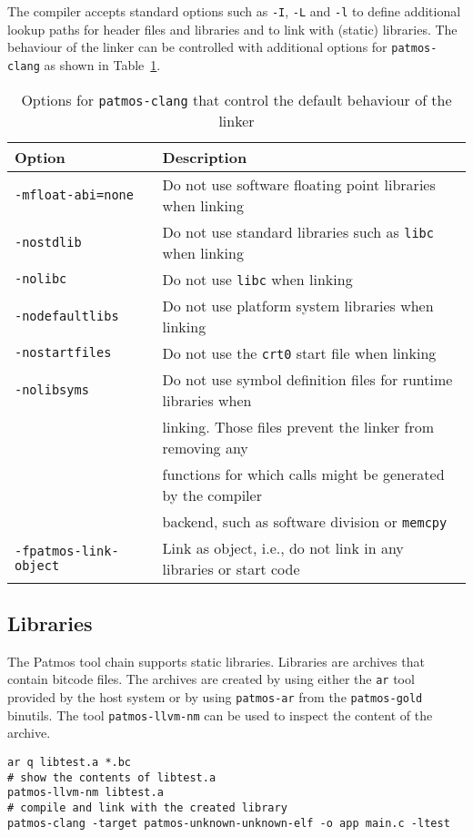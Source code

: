 The compiler accepts standard options such as \texttt{-I}, \texttt{-L} and \texttt{-l} to define additional
lookup paths for header files and libraries and to link with (static) libraries.
The behaviour of the linker can be controlled with additional options for \texttt{patmos-clang} 
as shown in Table~\ref{tab:linker_options}.

\begin{table}
\centering
\begin{tabular}{ll}
Option & Description \\ \hline
\texttt{-mfloat-abi=none} & Do not use software floating point libraries when linking \\
\texttt{-nostdlib} & Do not use standard libraries such as \texttt{libc} when linking \\
\texttt{-nolibc} & Do not use \texttt{libc} when linking \\
\texttt{-nodefaultlibs} & Do not use platform system libraries when linking\\
\texttt{-nostartfiles} & Do not use the \texttt{crt0} start file when linking \\
\texttt{-nolibsyms} & Do not use symbol definition files for runtime libraries when\\
                    & linking. Those files prevent the linker from removing any \\
		    & functions for which calls might be generated by the compiler \\
		    & backend, such as software division or \texttt{memcpy} \\
\texttt{-fpatmos-link-object} & Link as object, i.e., do not link in any libraries or start code 
\end{tabular}
\caption{Options for \texttt{patmos-clang} that control the default behaviour of the linker}
\label{tab:linker_options}
\end{table}

\subsection{Libraries}

The Patmos tool chain supports static libraries. Libraries are archives that contain
bitcode files. The archives are created by using either the \texttt{ar}
tool provided by the host system or by using \texttt{patmos-ar} from the \texttt{patmos-gold} binutils. The tool
\texttt{patmos-llvm-nm} can be used to inspect the content of the archive.

\begin{verbatim}
ar q libtest.a *.bc
# show the contents of libtest.a
patmos-llvm-nm libtest.a
# compile and link with the created library
patmos-clang -target patmos-unknown-unknown-elf -o app main.c -ltest
\end{verbatim}



